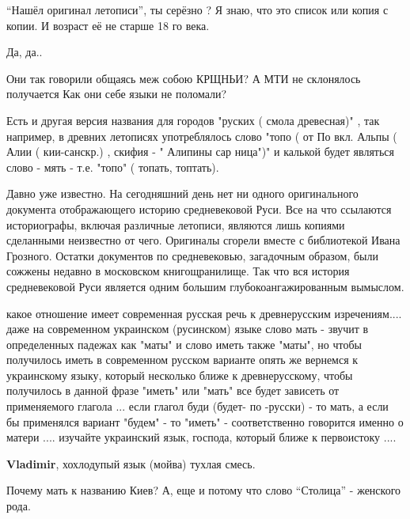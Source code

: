 \begin{itemize}

\enquote{Нашёл оригинал летописи}, ты серёзно ? Я знаю, что это список или копия с
копии. И возраст её не старше 18 го века.


Да, да..

Они так говорили общаясь меж собою КРЩНЬИ? А МТИ не склонялось получается Как
они себе языки не поломали?


Есть и другая версия названия для городов "руских ( смола древесная)" , так
например, в древних летописях употреблялось слово "топо ( от По вкл. Альпы (
Алии ( кии-санскр.) , скифия - " Алипины сар ница")" и калькой будет являться
слово - мять - т.е. "топо" ( топать, топтать).


Давно уже известно. На сегодняшний день нет ни одного оригинального документа
отображающего историю средневековой Руси. Все на что ссылаются историографы,
включая различные летописи, являются лишь копиями сделанными неизвестно от
чего. Оригиналы сгорели вместе с библиотекой Ивана Грозного. Остатки документов
по средневековью, загадочным образом, были сожжены недавно в московском
книгощранилище. Так что вся история средневековой Руси является одним большим
глубокоангажированным вымыслом.


какое отношение имеет современная русская речь к древнерусским изречениям....
даже на современном украинском (русинском) языке слово мать - звучит в
определенных падежах как "маты" и слово иметь также "маты", но чтобы
получилось иметь в современном русском варианте опять же вернемся к украинскому
языку, который несколько ближе к древнерусскому, чтобы получилось в данной
фразе "иметь" или "мать" все будет зависеть от применяемого глагола ... если
глагол буди (будет- по -русски) - то мать, а если бы применялся вариант "будем"
- то "иметь" - соответственно говорится именно о матери .... изучайте
украинский язык, господа, который ближе к первоистоку ....

\begin{itemize} %
\textbf{Vladimir}, хохлодупый язык (мойва) тухлая смесь.
\end{itemize} %

Почему мать к названию Киев? А, еще и потому что слово \enquote{Столица} - женского рода.


\end{itemize}

